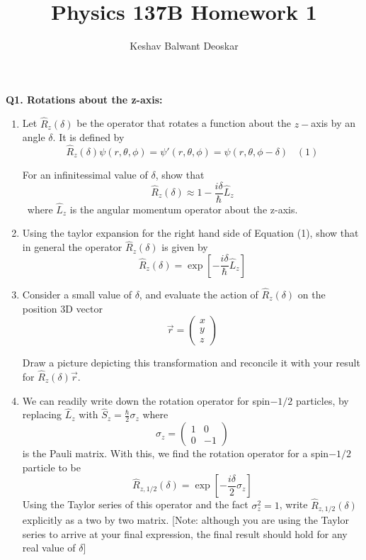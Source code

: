 \documentclass{article}
\title{Physics 137B Homework 1}
\author{Keshav Balwant Deoskar}
\begin{document}
\maketitle


\begin{dottedbox}
\textbf{Q1. Rotations about the z-axis:} 
\begin{enumerate}[label=(\alph*)]
  \item Let $\hat{R}_{z}(\delta)$ be the operator that rotates a function about the $z-$axis by an angle $\delta$. It is defined by 
  \[ \hat{R}_z (\delta) \psi(r, \theta, \phi) = \psi'(r, \theta, \phi) = \psi(r, \theta, \phi - \delta) \;\;\;(1) \]

  For an infinitessimal value of $\delta$, show that 
  \[ \hat{R}_z(\delta) \approx 1 - \frac{i\delta}{\hbar}\hat{L}_z \]\
  where $\hat{L}_z$ is the angular momentum operator about the z-axis.

  \vskip 0.5cm
  \item Using the taylor expansion for the right hand side of Equation (1), show that in general the operator $\hat{R}_{z}(\delta)$ is given by 
  \[ \hat{R}_{z}(\delta) = \exp\left[ -\frac{i\delta}{\hbar} \hat{L}_z \right] \]

  \vskip 0.5cm
  \item Consider a small value of $\delta$, and evaluate the action of $\hat{R}_z(\delta)$ on the position 3D vector 
  \[ \vec{r} = \begin{pmatrix}
    x \\
    y \\
    z
  \end{pmatrix} \]

  Draw a picture depicting this transformation and reconcile it with your result for $\hat{R}_z(\delta) \vec{r}$.

  \vskip 0.5cm
  \item We can readily write down the rotation operator for spin$-1/2$ particles, by replacing $\hat{L}_z$ with $\hat{S}_z = \frac{\hbar}{2} \sigma_z$
  where 
  \[ \sigma_z = \begin{pmatrix}
    1 & 0 \\
    0 & -1
  \end{pmatrix} \]
  is the Pauli matrix. With this, we find the rotation operator for a spin$-1/2$ particle to be 
  \[ \hat{R}_{z, 1/2}(\delta) = \exp\left[ -\frac{i \delta}{2} \sigma_z \right] \]
  Using the Taylor series of this operator and the fact $\sigma_z^2 = 1$, write $\hat{R}_{z, 1/2}(\delta) $ explicitly as a two by two matrix. [Note:
  although you are using the Taylor series to arrive at your final expression, the final result should hold for any real value of $\delta$]


\end{enumerate}
\end{dottedbox}
\end{document}
